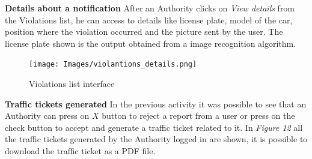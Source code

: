     \noindent\textbf{Details about a notification}\newline
    After an Authority clicks on \textit{View details} from the Violations list, he can access to details like license plate, model of the car, position where the violation occurred and the picture sent by the user. The license plate shown is the output obtained from a image recognition algorithm.
    \vspace{5mm}
            \begin{figure}[h]
        \centering
        \texttt{[image: Images/violantions\_details.png]}
        \caption{Violations list interface}
    \end{figure}
    
   \newpage
   
      \noindent \textbf{Traffic tickets generated}\newline
    In the previous activity it was possible to see that an Authority can press on $X$ button to reject a report from a user or press on the check button to accept and  generate a traffic ticket related to it. In \textit{Figure 12} all the traffic tickets generated by the Authority logged in are shown, it is possible to download the traffic ticket as a PDF file.
    
